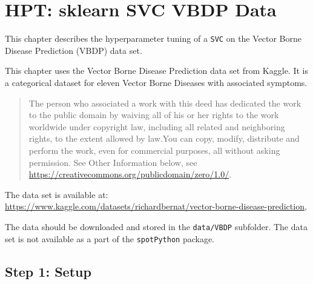 \documentclass[
  letterpaper,
  DIV=11,
  numbers=noendperiod]{scrreprt}
\begin{document}
\hypertarget{sec-hpt-sklearn-svc-vbdp-data}{%
\chapter{HPT: sklearn SVC VBDP
Data}\label{sec-hpt-sklearn-svc-vbdp-data}}

This chapter describes the hyperparameter tuning of a \texttt{SVC} on
the Vector Borne Disease Prediction (VBDP) data set.

\begin{tcolorbox}[enhanced jigsaw, rightrule=.15mm, opacityback=0, colframe=quarto-callout-important-color-frame, opacitybacktitle=0.6, toptitle=1mm, arc=.35mm, colbacktitle=quarto-callout-important-color!10!white, coltitle=black, toprule=.15mm, leftrule=.75mm, titlerule=0mm, title=\textcolor{quarto-callout-important-color}{\faExclamation}\hspace{0.5em}{Vector Borne Disease Prediction Data Set}, bottomrule=.15mm, breakable, bottomtitle=1mm, left=2mm, colback=white]

This chapter uses the Vector Borne Disease Prediction data set from
Kaggle. It is a categorical dataset for eleven Vector Borne Diseases
with associated symptoms.

\begin{quote}
The person who associated a work with this deed has dedicated the work
to the public domain by waiving all of his or her rights to the work
worldwide under copyright law, including all related and neighboring
rights, to the extent allowed by law.You can copy, modify, distribute
and perform the work, even for commercial purposes, all without asking
permission. See Other Information below, see
\url{https://creativecommons.org/publicdomain/zero/1.0/}.
\end{quote}

The data set is available at:
\url{https://www.kaggle.com/datasets/richardbernat/vector-borne-disease-prediction},

The data should be downloaded and stored in the \texttt{data/VBDP}
subfolder. The data set is not available as a part of the
\texttt{spotPython} package.

\end{tcolorbox}

\hypertarget{sec-setup-18}{%
\section{Step 1: Setup}\label{sec-setup-18}}
\end{document}
